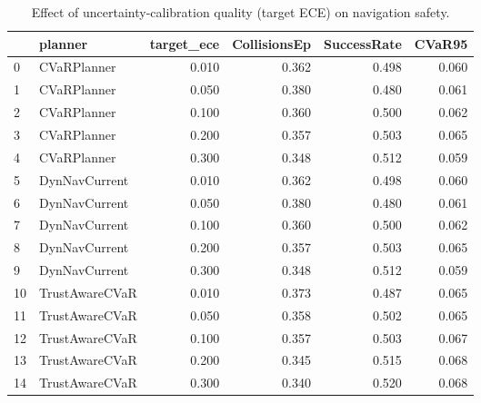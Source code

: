 \begin{table}
\caption{Effect of uncertainty-calibration quality (target ECE) on navigation safety.}
\label{tab:calibration}
\begin{tabular}{llrrrr}
\toprule
 & planner & target\_ece & CollisionsEp & SuccessRate & CVaR95 \\
\midrule
0 & CVaRPlanner & 0.010 & 0.362 & 0.498 & 0.060 \\
1 & CVaRPlanner & 0.050 & 0.380 & 0.480 & 0.061 \\
2 & CVaRPlanner & 0.100 & 0.360 & 0.500 & 0.062 \\
3 & CVaRPlanner & 0.200 & 0.357 & 0.503 & 0.065 \\
4 & CVaRPlanner & 0.300 & 0.348 & 0.512 & 0.059 \\
5 & DynNavCurrent & 0.010 & 0.362 & 0.498 & 0.060 \\
6 & DynNavCurrent & 0.050 & 0.380 & 0.480 & 0.061 \\
7 & DynNavCurrent & 0.100 & 0.360 & 0.500 & 0.062 \\
8 & DynNavCurrent & 0.200 & 0.357 & 0.503 & 0.065 \\
9 & DynNavCurrent & 0.300 & 0.348 & 0.512 & 0.059 \\
10 & TrustAwareCVaR & 0.010 & 0.373 & 0.487 & 0.065 \\
11 & TrustAwareCVaR & 0.050 & 0.358 & 0.502 & 0.065 \\
12 & TrustAwareCVaR & 0.100 & 0.357 & 0.503 & 0.067 \\
13 & TrustAwareCVaR & 0.200 & 0.345 & 0.515 & 0.068 \\
14 & TrustAwareCVaR & 0.300 & 0.340 & 0.520 & 0.068 \\
\bottomrule
\end{tabular}
\end{table}
